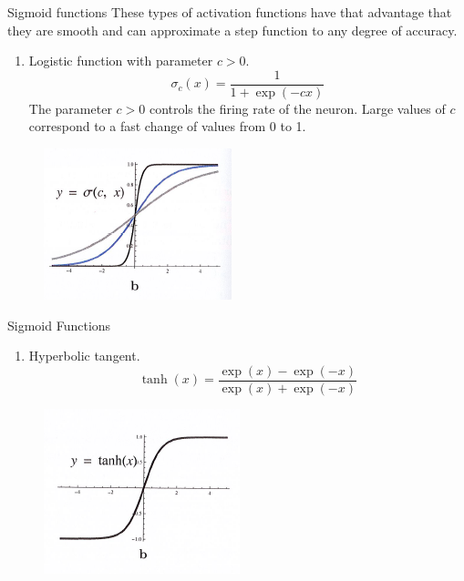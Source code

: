 \documentclass{beamer}
\begin{document}
\begin{frame}{Sigmoid functions}
These types of activation functions have that advantage that they are smooth and can approximate a step function to any degree of accuracy.
	\begin{enumerate}
		\item Logistic function with parameter $c>0$.
		\begin{equation*}
			\sigma_c(x)= \frac{1}{1+ \exp(-cx)}
		\end{equation*}
		The parameter $c>0$ controls the firing rate of the neuron. Large values of $c $ correspond to a fast change of values from 0 to 1. 
	\end{enumerate}
	\begin{figure}[h]
	\centering
	\includegraphics[scale=0.5]{../../Figures/fig_activation_27b}
\end{figure}
\end{frame}

\begin{frame}{Sigmoid Functions}
	\begin{enumerate}
		\item Hyperbolic tangent. 
		\begin{equation*}
			\tanh (x)= \frac{\exp(x)- \exp(-x)}{\exp(x)+ \exp(-x)}
		\end{equation*}
	\end{enumerate}
	\begin{figure}[h]
	\centering
	\includegraphics[scale=0.8]{../../Figures/fig_activation_28b}
\end{figure}
\end{frame}
\end{document}
